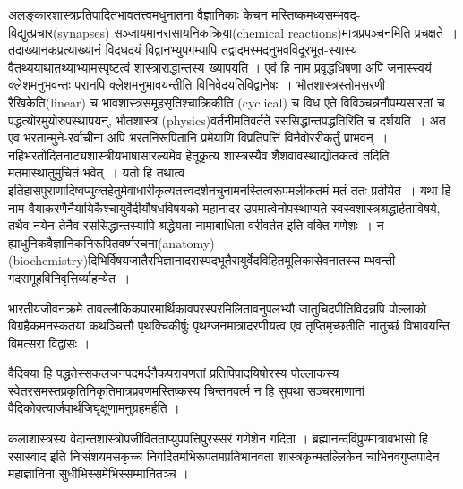 {\dev अलङ्कारशास्त्रप्रतिपादितभावतत्त्वमधुनातना वैज्ञानिकाः केचन मस्तिष्कमध्यसम्भवद्-विद्यु\-त्प्रचार}(synapses) {\dev सञ्जायमानरासायनिकक्रिया}(chemical reactions){\dev मात्रप्रपञ्चनमिति प्रचक्षते~। तदाख्यानकप्रत्याख्यानं विदधदयं विद्वानभ्युपगम्यापि तद्वादमस्मदनुभवविदूरभूत-\break\-स्यास्य वैतथ्ययाथातथ्याभ्यामस्पृष्टत्वं शास्त्राराद्धा\-न्तस्य ख्यापयति । एवं हि नाम प्रवृद्ध\-धिषणा अपि जनास्स्वयं क्लेशमनुभवन्तः परानपि क्लेशमनुभावयन्तीति विनिवेदयति\break विद्वानेषः~। भौत\-शास्त्रस्तोमसरणी रैखिकेति}(linear) {\dev च भावशास्त्र\-समूहसृतिश्चाक्रिकीति} (cyclical) {\dev च विध एते विविञ्चन्ननौपम्यसारतां च पद्धत्योरमुयोरुपस्थापयन्, भौतशास्त्र} (physics){\dev वर्त\-नीमति\-वर्तते रससिद्धान्तपद्धतिरिति च दर्शयति~। अत एव भरतान्मुने{-}\break रर्वाचीना अपि भरत\-निरूपितानि प्रमेयाणि विप्रतिपत्तिं विनैवोररीकर्तुं प्राभवन्~। नहि\break भरतोदितनाट्य\-शास्त्रीय\-भाषासारल्यमेव हेतूकृत्य शास्त्रस्यैव शैशवावस्थाद्योतकत्वं तदिति मतमास्थातुमुचितं भवेत्~। यतो हि तथात्व इतिहासपुराणादिष्वप्युक्तहेतुमेवाधारीकृत्य\break   तत्त्वदर्शनचुनामनस्ति\-त्वरूपमलीकतमं मतं ततः प्रती\-येत~। यथा हि नाम वैयाकरणैर्नैयायि\-कैश्चायुर्वेदीयौषधविषयको महानादर उपमात्वे\-नोपस्थाप्यते स्वस्वशास्त्रश्रद्धार्हताविषये, तथैव नयेन तेनैव रससिद्धान्तस्यापि श्रद्धेयता नामा\-बाधिता वरीवर्तत इति वक्ति गणेशः~। न ह्याधुनिकवैज्ञानिकनिरूपितवर्ष्मरचना}(anatomy)\break (bio\-chem\-istry){\dev दिभिर्विषयजातैरभिज्ञानादरास्पदभूतैरायु\-र्वेद\-विहित\-मूलिका\-सेवनातस्स{-}\break म्भवन्ती गदसमूहविनिवृत्तिर्व्याहन्येत~।}

{\dev भारतीयजीवनक्रमे तावल्लौकिकपारमार्थिकावपरस्परमिलितावनुपलभ्यौ जातुचिदपीति\break विदन्नपि पोल्लाको विग्रहैकमनस्कतया कथञ्चित्तौ पृथक्चिकीर्षुः पृथग्जनमात्रादरणीयत्व एव तृप्तिमृच्छतीति नातुच्छं विभावयन्ति विमत्सरा विद्वांसः ।}

{\dev वैदिक्या हि पद्धतेस्सकलजनपदमर्दनैकपरायणतां प्रतिपिपादयिषोरस्य पोल्लाकस्य स्वेतर\-समस्तप्रकृतिनिकृतिमात्रप्रवणमस्तिष्कस्य चिन्तनवर्त्म न हि सुपथा सञ्चरमाणानां वैदिको\-क्त्यार्जवार्थजिघृक्षूणामनुग्रहमर्हति ।}

{\dev कलाशास्त्रस्य वेदान्तशास्त्रोपजीवितताप्युपपत्तिपुरस्सरं गणेशेन गदिता । ब्रह्मानन्दविप्रु\-ण्मात्रावभासो हि रसास्वाद इति निःसंशयमसकृच्च निगदितमभिरूपतमप्रतिभानवता शास्त्रकृन्मत\-ल्लिकेन चाभिनवगुप्तपादेन महाज्ञानिना सुधीभिस्समेभिस्सम्मानितञ्च ।}

